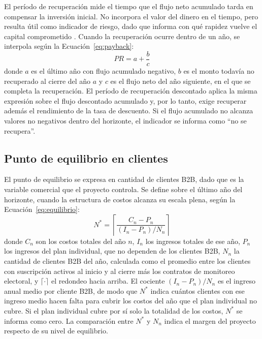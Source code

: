 El período de recuperación mide el tiempo que el flujo neto acumulado tarda en compensar la inversión inicial. No incorpora el valor del dinero en el tiempo, pero resulta útil como indicador de riesgo, dado que informa con qué rapidez vuelve el capital comprometido \parencite{SapagEtAl2014}. Cuando la recuperación ocurre dentro de un año, se interpola según la Ecuación~\eqref{eq:payback}:
\begin{equation}
  \label{eq:payback}
  PR = a + \frac{b}{c}
\end{equation}
donde $a$ es el último año con flujo acumulado negativo, $b$ es el monto todavía no recuperado al cierre del año $a$ y $c$ es el flujo neto del año siguiente, en el que se completa la recuperación. El período de recuperación descontado aplica la misma expresión sobre el flujo descontado acumulado y, por lo tanto, exige recuperar además el rendimiento de la tasa de descuento. Si el flujo acumulado no alcanza valores no negativos dentro del horizonte, el indicador se informa como \enquote{no se recupera}.

\subsection{Punto de equilibrio en clientes}

El punto de equilibrio se expresa en cantidad de clientes B2B, dado que es la variable comercial que el proyecto controla. Se define sobre el último año del horizonte, cuando la estructura de costos alcanza su escala plena, según la Ecuación~\eqref{eq:equilibrio}:
\begin{equation}
  \label{eq:equilibrio}
  N^{*} = \left\lceil \frac{C_n - P_n}{(I_n - P_n) / N_n} \right\rceil
\end{equation}
donde $C_n$ son los costos totales del año $n$, $I_n$ los ingresos totales de ese año, $P_n$ los ingresos del plan individual, que no dependen de los clientes B2B, $N_n$ la cantidad de clientes B2B del año, calculada como el promedio entre los clientes con suscripción activos al inicio y al cierre más los contratos de monitoreo electoral, y $\lceil \cdot \rceil$ el redondeo hacia arriba. El cociente $(I_n - P_n) / N_n$ es el ingreso anual medio por cliente B2B, de modo que $N^{*}$ indica cuántos clientes con ese ingreso medio hacen falta para cubrir los costos del año que el plan individual no cubre. Si el plan individual cubre por sí solo la totalidad de los costos, $N^{*}$ se informa como cero. La comparación entre $N^{*}$ y $N_n$ indica el margen del proyecto respecto de su nivel de equilibrio.

